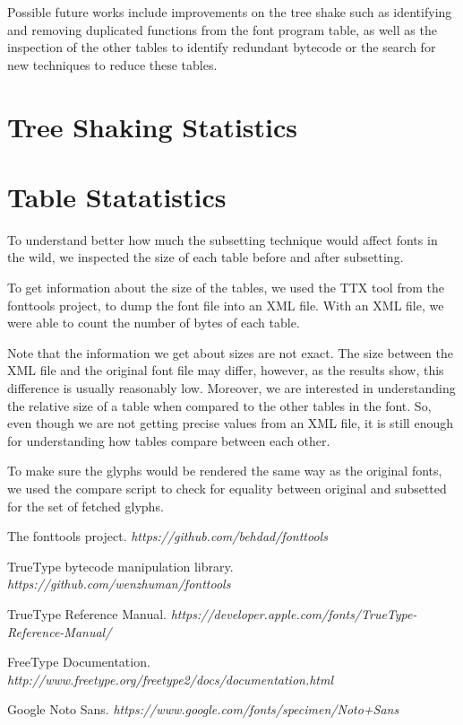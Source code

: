\documentclass[12pt]{article}
\begin{document}
Possible future works include improvements on the tree shake such as
identifying and removing duplicated functions from the font program
table, as well as the inspection of the other tables to identify
redundant bytecode or the search for new techniques to reduce these
tables.

\clearpage
\begin{appendices}
\section{Tree Shaking Statistics}



\section{Table Statatistics}

To understand better how much the subsetting technique would affect
fonts in the wild, we inspected the size of each table before and after
subsetting.

To get information about the size of the tables, we used the TTX tool
from the fonttools project, to dump the font file into an XML file. With
an XML file, we were able to count the number of bytes of each table.

Note that the information we get about sizes are not exact. The size
between the XML file and the original font file may differ, however, as the
results show, this difference is usually reasonably low. Moreover, we
are interested in understanding the relative size of a table when
compared to the other tables in the font. So, even though we are not
getting precise values from an XML file, it is still enough for
understanding how tables compare between each other.

To make sure the glyphs would be rendered the same way as the original
fonts, we used the compare script to check for equality between original
and subsetted for the set of fetched glyphs. 



\end{appendices}

\clearpage
\begin{thebibliography}{1}

 The fonttools project. {\em https://github.com/behdad/fonttools } 

 TrueType bytecode manipulation library. 
{\em https://github.com/wenzhuman/fonttools } 

 TrueType Reference Manual. 
{\em https://developer.apple.com/fonts/TrueType-Reference-Manual/ } 

 FreeType Documentation.
{\em http://www.freetype.org/freetype2/docs/documentation.html }

 Google Noto Sans. 
{\em https://www.google.com/fonts/specimen/Noto+Sans } 

\end{thebibliography}
\end{document}
